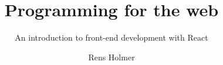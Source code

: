 \documentclass[10pt]{beamer}
\title{Programming for the web}
\subtitle{An introduction to front-end development with React}
\author{Rens Holmer}
\institute{Wageningen University -- Bioinformatics}
\begin{document}
\begin{frame}
	\titlepage
\end{frame}
\end{document}
